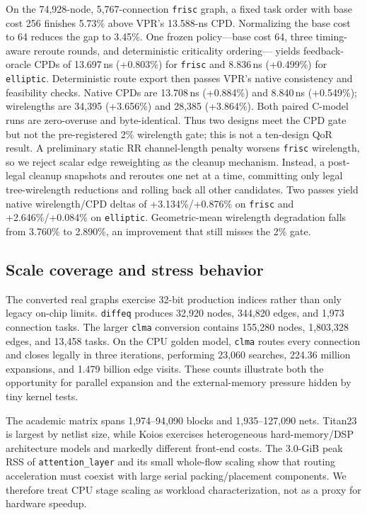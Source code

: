 \documentclass[sigconf,anonymous,review]{acmart}
\begin{document}
On the 74,928-node, 5,767-connection \texttt{frisc} graph, a fixed task order
with base cost 256 finishes 5.73\% above VPR's 13.588-ns CPD. Normalizing the
base cost to 64 reduces the gap to 3.45\%. One frozen policy---base cost 64,
three timing-aware reroute rounds, and deterministic criticality ordering---
yields feedback-oracle CPDs of 13.697\,ns (+0.803\%) for \texttt{frisc} and
8.836\,ns (+0.499\%) for \texttt{elliptic}. Deterministic route export then
passes VPR's native consistency and feasibility checks. Native CPDs are
13.708\,ns (+0.884\%) and 8.840\,ns (+0.549\%); wirelengths are 34,395
(+3.656\%) and 28,385 (+3.864\%). Both paired C-model runs are zero-overuse
and byte-identical. Thus two designs meet the CPD gate but not the
pre-registered 2\% wirelength gate; this is not a ten-design QoR result.
A preliminary static RR channel-length penalty worsens \texttt{frisc}
wirelength, so we reject scalar edge reweighting as the cleanup mechanism.
Instead, a post-legal cleanup snapshots and reroutes one net at a time,
committing only legal tree-wirelength reductions and rolling back all other
candidates. Two passes yield native wirelength/CPD deltas of
+3.134\%/+0.876\% on \texttt{frisc} and +2.646\%/+0.084\% on
\texttt{elliptic}. Geometric-mean wirelength degradation falls from 3.760\%
to 2.890\%, an improvement that still misses the 2\% gate.

\subsection{Scale coverage and stress behavior}

The converted real graphs exercise 32-bit production indices rather than only
legacy on-chip limits. \texttt{diffeq} produces 32,920 nodes, 344,820 edges,
and 1,973 connection tasks. The larger \texttt{clma} conversion contains
155,280 nodes, 1,803,328 edges, and 13,458 tasks. On the CPU golden model,
\texttt{clma} routes every connection and closes legally in three iterations,
performing 23,060 searches, 224.36 million expansions, and 1.479 billion edge
visits. These counts illustrate both the opportunity for parallel expansion
and the external-memory pressure hidden by tiny kernel tests.

The academic matrix spans 1,974--94,090 blocks and 1,935--127,090 nets.
Titan23 is largest by netlist size, while Koios exercises heterogeneous
hard-memory/DSP architecture models and markedly different front-end costs.
The 3.0-GiB peak RSS of \texttt{attention\_layer} and its small whole-flow
scaling show that routing acceleration must coexist with large serial
packing/placement components. We therefore treat CPU stage scaling as workload
characterization, not as a proxy for hardware speedup.
\end{document}
